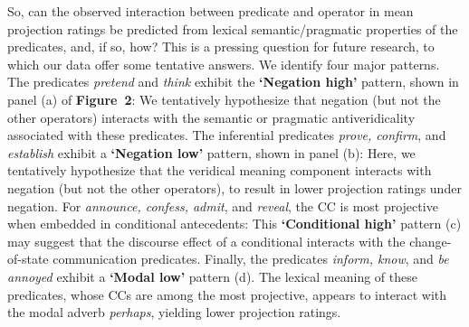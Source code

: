 \documentclass[12pt, a4paper]{article}
\begin{document}

	So, can the observed interaction between predicate and operator in mean projection ratings be predicted from lexical semantic/pragmatic properties of the predicates, and, if so, how?
	This is a pressing question for future research, to which our data offer some tentative answers. We identify four major patterns.
	The predicates \emph{pretend} and \emph{think} exhibit the {\bf `Negation high'} pattern, shown in panel (a) of \textbf{Figure~2}: We tentatively hypothesize that negation (but not the other operators) interacts with the semantic or pragmatic antiveridicality associated with these predicates.
	The inferential predicates \emph{prove, confirm}, and \emph{establish} exhibit a {\bf `Negation low'} pattern, shown in panel (b): Here, we tentatively hypothesize that the veridical meaning component interacts with negation (but not the other operators), to result in lower projection ratings under negation.
	For \emph{announce, confess, admit}, and \emph{reveal}, the CC is most projective when embedded in conditional antecedents: This {\bf `Conditional high'} pattern (c) may suggest that the discourse effect of a conditional interacts with the change-of-state communication predicates.
	Finally, the predicates  \emph{inform, know}, and \emph{be annoyed} exhibit a {\bf `Modal low'} pattern (d). The lexical meaning of these predicates, whose CCs are among the most projective, appears to interact with the modal adverb {\em perhaps}, yielding lower projection ratings.


\end{document}
